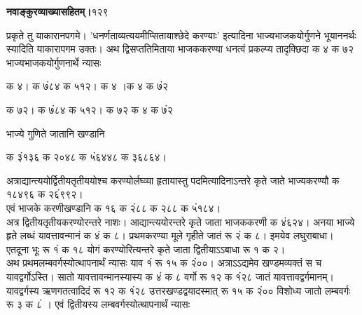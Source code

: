 \documentclass[11pt, openany]{book}
\begin{document}
\onehalfspacing
\hspace{2in}\textbf{नवाङ्कुरव्याख्यासहितम्।}\hspace{2in}१२९

\vspace{5mm}

\begin{sloppypar}
\hangindent=0.2in प्रकृते तु याकारानपगमे। 'धनर्णताव्यत्ययमीप्सितायाश्छेदे करण्याः' इत्यादिना भाज्यभाजकयोर्गुणने भूयाननर्थः स्यादिति याकारापगम उक्तः। अथ द्विसप्ततिमिताया भाजककरण्या धनत्वं प्रकल्प्य तादृक्छिदा क ४ क ७२ भाज्यभाजकयोर्गुणनार्थे न्यासः

\begin{center}
 क  ४। क ७ं८४ क ५१२।\hspace{0.25in} क ४ ।क ४ क ७ं२

 क ७२। क ७ं८४ क ५१२।\hspace{0.25in} क ७२ क ४ क ७ं२
\end{center}

\hangindent=0.2in भाज्ये गुणिते जातानि खण्डानि

\begin{center}
 क ३ं१३६ क २०४८ क ५ं६४४८ क ३६८६४।
\end{center}

\hangindent=0.2in अत्राद्यान्त्ययोर्द्वितीयतृतीययोश्च करण्योर्लघ्व्या हृतायास्तु पदमित्यादिनाऽन्तरे कृते जाते भाज्यकरण्यौ क १८४९६ क २६ं९९२।\\

\hangindent=0.2in \hspace{0.2in}एवं भाजके करणीखण्डानि क १६ क २ं८८ क २८८ क ५ं१८४।\\

\hangindent=0.2in \hspace{0.2in}अत्र द्वितीयतृतीयकरण्योरन्तरे नाशः। आद्यान्त्ययोरन्तरे कृते जाता भाजककरणी क ४ं६२४। अनया भाज्ये हृते लब्धं यावत्तावन्मानं क ४ं क ८। प्रथमकरण्या मूले गृहीते जातं रू २ं क ८। इमयेव लघुराबाधा। एतदूना भूः रू १ं क १८ योगं करण्योरित्यन्तरे कृते जाता द्वितीयाऽऽबाधा रू १ क २।\\

\hangindent=0.2in \hspace{0.2in}अथ प्रथमलम्बवर्गस्योत्थापनार्थं न्यासः याव १ं रू १५ क २ं००। अत्राऽऽद्यमेव खण्डमव्यक्तं स च यावद्वर्गोऽस्ति। सातो यावत्तावन्मानस्यास्य क ४ं क ८ वर्गो रू १२ क १ं२८ जातं यावत्तावद्वर्गमानम्। यावद्वर्गस्य ऋणगतत्वादिदं रू १२ क १ं२८ उत्तरखण्डद्वयादस्मात् रू १५ क २ं०० विशोध्य जातो लम्बवर्गः रू ३ क ८ं । एवं द्वितीयस्य लम्बवर्गस्योत्थापनार्थं न्यासः\\


\end{sloppypar}
\end{document}
